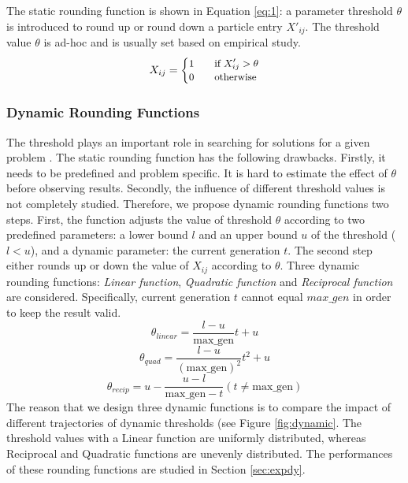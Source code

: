 \documentclass[10pt,journal,compsoc]{IEEEtran}
\begin{document}
The static rounding function is shown in Equation \ref{eq:1}: a parameter threshold $\theta$ is introduced to round up or round down a particle entry $X'_{ij}$.
The threshold value $\theta$ is ad-hoc and is usually set based on empirical study.
 \begin{equation}
\footnotesize
  \label{eq:1}
  X_{ij} =
  \begin{cases}
   1 & \quad \text{if } X'_{ij} > \theta \\
   0 & \quad \text{otherwise} \\
  \end{cases}
 \end{equation}
\vspace{-5 mm}

\subsubsection{Dynamic Rounding Functions}
\label{sec:dynamic}
The threshold plays an important role in searching for solutions for a given problem \cite{Tan2016a}. The static rounding function has the following drawbacks. Firstly, it needs to be predefined and problem specific. It is hard to estimate the effect of $\theta$ before observing results. Secondly, the influence of different threshold values is not completely studied. Therefore, we propose dynamic rounding functions two steps. First, the function adjusts the value of threshold $\theta$ according to two predefined parameters: a lower bound $l$ and an upper bound $u$ of the threshold ($l < u$), and a dynamic parameter: the current generation $t$. The second step either rounds up or down the value of $X_{ij}$ according to $\theta$. Three dynamic rounding functions: \emph{Linear function}, \emph{Quadratic function} and \emph{Reciprocal function} are considered. Specifically, current generation $t$ cannot equal $max\_gen$ in order to keep the result valid. 
\vspace{-3 mm}
\small
\begin{equation}
\label{eq:linear}
 \theta_{linear} = \frac{l - u}{\text{max\_gen}} t + u
\end{equation}
\begin{equation}
\label{eq:quadratic}
 \theta_{quad} = \frac{l - u}{(\text{max\_gen})^2} t^2 + u
\end{equation}
\begin{equation}
\label{eq:reciprocal}
 \theta_{recip} = u - \frac{u - l}{\text{max\_gen} - t}  (t \neq \text{max\_gen})
\end{equation}
\normalsize
The reason that we design three dynamic functions is to compare the impact of different trajectories of dynamic thresholds (see Figure \ref{fig:dynamic}. 
The threshold values with a Linear function are uniformly distributed, whereas Reciprocal and Quadratic functions are unevenly distributed. The performances of these rounding functions are studied in Section \ref{sec:expdy}. 
\end{document}
